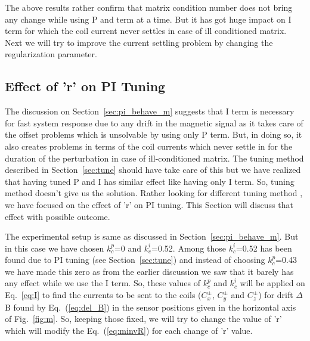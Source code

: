 \FloatBarrier
The above results rather confirm that matrix condition number does not bring any change while using P and  term at a time. But it has got huge impact on I term for which the coil current never settles in case of ill conditioned matrix. Next we will try to improve the current settling problem by changing the regularization parameter.

\subsection{Effect of 'r' on PI Tuning}\label{sec:r_pi}

The discussion on Section~\ref{sec:pi_behave_m} suggests that I term is necessary for fast system response due to any drift in the magnetic signal as it takes care of the offset problems which is unsolvable by using only P term. But, in doing so, it also creates problems in terms of the coil currents which never settle in for the duration of the perturbation in case of ill-conditioned matrix. The tuning method described in Section~\ref{sec:tune} should have take care of this but we have realized that having tuned P and I has similar effect like having only I term. So, tuning method doesn't give us the solution. Rather looking for different tuning method , we have focused on the effect of 'r' on PI tuning. This Section will discuss that effect with possible outcome.

The experimental setup is same as discussed in Section~\ref{sec:pi_behave_m}. But in this case we have chosen $k_c^p$=0 and $k_c^i$=0.52. Among those $k_c^i$=0.52 has been found due to PI tuning (see Section~\ref{sec:tune}) and instead of choosing  $k_c^p$=0.43 we have made this zero as from the earlier discussion we saw that it barely has any effect while we use the I term. So, these values of $k_c^p$ and $k_c^i$ will be applied on Eq.~\ref{eq:I} to find the currents to be sent to the coils ($C_x^\pm$, $C_y^\pm$ and $C_z^\pm$) for drift $\Delta$B found by Eq.~(\ref{eq:del_B}) in the sensor positions given in the horizontal axis of Fig.~\ref{fig:m}. So, keeping those fixed, we will try to change the value of 'r' which will modify the Eq.~(\ref{eq:minvR}) for each change of 'r' value.

